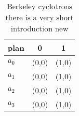 \documentclass[a4paper]{article}
\begin{document}
\begin{table}
\begin{adjustbox}{width=0.7\columnwidth}
\begin{tabular}{|l|l|l|}
\hline
\textbf{plan} & \multicolumn{1}{c|}{\textbf{0}} & \multicolumn{1}{c|}{\textbf{1}} \\ \hline
\textbf{$a_0$}  & (0,0) & (1,0) \\ \hline
\textbf{$a_1$}  & (0,0) & (1,0) \\ \hline
\textbf{$a_2$}  & (0,0) & (1,0) \\ \hline
\textbf{$a_3$}  & (0,0) & (1,0) \\ \hline
\end{tabular}
\end{adjustbox}
\caption{Berkeley cyclotrons there is a very short introduction new 
}
\end{table}
\end{document}
